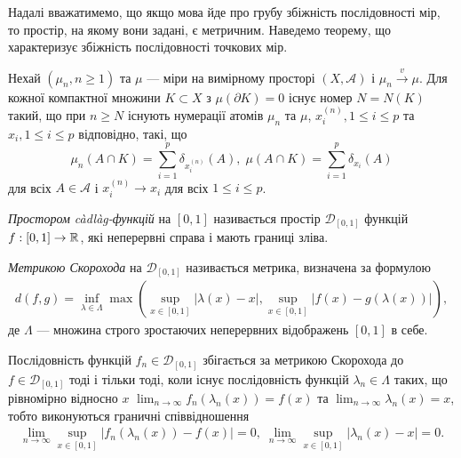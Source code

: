 Надалі вважатимемо, що якщо мова йде про
грубу збіжність послідовності мір, то простір, на якому вони задані,
є метричним.
Наведемо теорему, що характеризує збіжність послідовності точкових мір.
\begin{theorem}\label{th:point_mes_conv}
    Нехай $\left(\mu_n, n \geq 1\right)$ та $\mu$ --- міри
    на вимірному просторі $\left(X, \mathcal{A}\right)$ і
    $\mu_n \overset{v}{\longrightarrow} \mu$. Для кожної компактної множини
    $K \subset X$ з $\mu(\partial K) = 0$ існує номер $N = N(K)$ такий,
    що при $n \geq N$ існують нумерації атомів $\mu_n$ та 
    $\mu$, $x_i^{(n)}, 1 \leq i \leq p$ та $x_i, 1 \leq i \leq p$ відповідно, такі, що
    $$
        \mu_n(A \cap K) = \sum_{i=1}^p \delta_{x_i^{(n)}} (A), \;
        \mu(A \cap K) = \sum_{i=1}^p \delta_{x_i} (A)
    $$
    для всіх $A \in \mathcal{A}$ і $x_i^{(n)} \to x_i$ для всіх $1 \leq i \leq p$.
\end{theorem}

\begin{definition}
    \emph{Простором càdlàg-функцій} на $[0, 1]$ називається простір $\mathcal{D}_{[0, 1]}$
    функцій $f : [0, 1] \to \mathbb{R}$, які неперервні справа і мають границі зліва.
\end{definition}

\begin{definition}
    \emph{Метрикою Скорохода} на $\mathcal{D}_{[0, 1]}$ називається метрика, визначена за формулою
    \begin{gather*}
        d(f, g) = \inf_{\lambda \in \Lambda} \max \left(
            \sup_{x \in [0, 1]} \left|\lambda(x) - x\right|, 
            \sup_{x \in [0, 1]} \left|f(x) - g(\lambda(x))\right|
        \right),
    \end{gather*}
    де $\Lambda$ --- множина строго зростаючих неперервних відображень
    $[0, 1]$ в себе.

    Послідовність функцій $f_n \in \mathcal{D}_{[0, 1]}$ збігається за метрикою Скорохода до $f \in \mathcal{D}_{[0, 1]}$
    тоді і тільки тоді, коли існує послідовність функцій $\lambda_n \in \Lambda$ таких, що
    рівномірно відносно $x$
    $\lim_{n\to\infty} f_n \left(\lambda_n(x)\right) = f(x)$ та
    $\lim_{n\to\infty} \lambda_n(x) = x$, тобто
    виконуються граничні співвідношення
    \begin{gather*}
        \lim_{n\to\infty} \sup_{x\in[0, 1]}\left| f_n \left(\lambda_n(x)\right) - f(x) \right| = 0, \;
        \lim_{n\to\infty} \sup_{x\in[0, 1]}\left| \lambda_n(x) - x \right| = 0.
    \end{gather*}
\end{definition}

